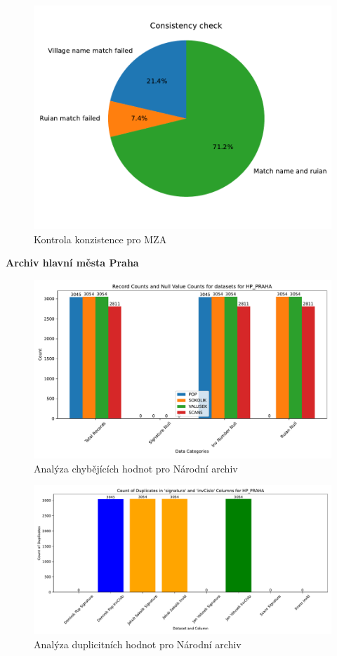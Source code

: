 \begin{figure}[htbp]
\centering
    \includegraphics[scale=.7]{obrazky-figures/dataAnalysis/mza/consistencyCheck2.pdf}
    \caption{Kontrola konzistence pro MZA}
\end{figure}

\newpage
\noindent\textbf{Archiv hlavní města Praha}\\
\begin{figure}[htbp]
\centering
    \includegraphics[scale=.5]{obrazky-figures/dataAnalysis/hpPraha/missingValues.pdf}
    \caption{Analýza chybějících hodnot pro Národní archiv}
\end{figure}

\begin{figure}[htbp]
\centering
    \includegraphics[scale=.5]{obrazky-figures/dataAnalysis/hpPraha/duplicities.pdf}
    \caption{Analýza duplicitních hodnot pro Národní archiv}
\end{figure}

